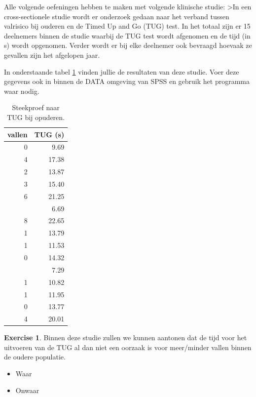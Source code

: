\documentclass[
]{book}
\providecommand{\tightlist}{%
  \setlength{\itemsep}{0pt}\setlength{\parskip}{0pt}}
\theoremstyle{definition}
\theoremstyle{definition}
\theoremstyle{definition}
\newtheorem{exercise}{Exercise}[chapter]
\theoremstyle{definition}
\theoremstyle{remark}
\begin{document}
Alle volgende oefeningen hebben te maken met volgende klinische studie: \textgreater In een cross-sectionele studie wordt er onderzoek gedaan naar het verband tussen valrisico bij ouderen en de Timed Up and Go (TUG) test. In het totaal zijn er 15 deelnemers binnen de studie waarbij de TUG test wordt afgenomen en de tijd (in s) wordt opgenomen. Verder wordt er bij elke deelnemer ook bevraagd hoevaak ze gevallen zijn het afgelopen jaar.

In onderstaande tabel \ref{tab:TUG} vinden jullie de resultaten van deze studie. Voer deze gegevens ook in binnen de DATA omgeving van {SPSS} en gebruik het programma waar nodig.

\begin{table}

\caption{\label{tab:TUG}Steekproef naar TUG bij opuderen.}
\centering
\begin{tabular}[t]{rr}
\toprule
vallen & TUG (s)\\
\midrule
0 & 9.69\\
4 & 17.38\\
2 & 13.87\\
3 & 15.40\\
6 & 21.25\\
\addlinespace
1 & 6.69\\
8 & 22.65\\
1 & 13.79\\
1 & 11.53\\
0 & 14.32\\
\addlinespace
0 & 7.29\\
1 & 10.82\\
1 & 11.95\\
0 & 13.77\\
4 & 20.01\\
\bottomrule
\end{tabular}
\end{table}

\begin{exercise}

Binnen deze studie zullen we kunnen aantonen dat de tijd voor het uitvoeren van de TUG al dan niet een oorzaak is voor meer/minder vallen binnen de oudere populatie.

\begin{itemize}
\tightlist
\item
  Waar
\item
  Onwaar
\end{itemize}

\end{exercise}
\end{document}

